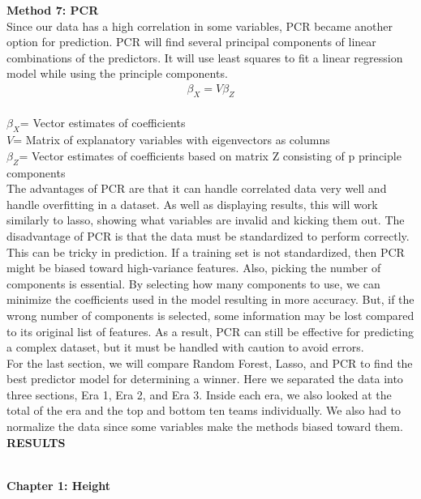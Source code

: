 \documentclass[11pt,letterpaper]{amsart}
\begin{document}
\noindent \large \textbf{Method 7: PCR}\\
\indent Since our data has a high correlation in some variables, PCR became another option for prediction. PCR will find several principal components of linear combinations of the predictors. It will use least squares to fit a linear regression model while using the principle components. 
\begin{align*}
\beta_X = V\beta_Z
\end{align*}\\
\textbf{$\beta_X$}= Vector estimates of coefficients\\
\textbf{$V$}= Matrix of explanatory variables with eigenvectors as columns \\
\textbf{$\beta_Z$}= Vector estimates of coefficients based on matrix Z consisting of p principle components\\
\cite{10} \leavevmode \newline
\indent The advantages of PCR are that it can handle correlated data very well and handle overfitting in a dataset. As well as displaying results, this will work similarly to lasso, showing what variables are invalid and kicking them out. The disadvantage of PCR is that the data must be standardized to perform correctly. This can be tricky in prediction. If a training set is not standardized, then PCR might be biased toward high-variance features. Also, picking the number of components is essential. By selecting how many components to use, we can minimize the coefficients used in the model resulting in more accuracy. But, if the wrong number of components is selected, some information may be lost compared to its original list of features. As a result, PCR can still be effective for predicting a complex dataset, but it must be handled with caution to avoid errors.\\

\indent For the last section, we will compare Random Forest, Lasso, and PCR to find the best predictor model for determining a winner. Here we separated the data into three sections, Era 1, Era 2, and Era 3. Inside each era, we also looked at the total of the era and the top and bottom ten teams individually. We also had to normalize the data since some variables make the methods biased toward them.
\newpage \noindent \textbf{{\LARGE RESULTS}} \\\\

\begin{Large}
\textbf{Chapter 1: Height}
\end{Large}\\
\end{document}
